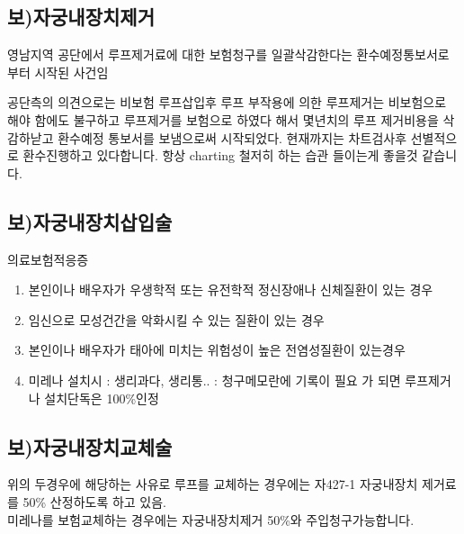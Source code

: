 \subsection{보)자궁내장치제거}
{
\par
영남지역 공단에서 루프제거료에 대한 보험청구를 일괄삭감한다는 환수예정통보서로 부터 시작된 사건임\par
공단측의 의견으로는 비보험 루프삽입후 루프 부작용에 의한 루프제거는 비보험으로 해야 함에도 불구하고 루프제거를 보험으로 하였다 해서 몇년치의 루프 제거비용을 삭감하낟고 환수예정 통보서를 보냄으로써 시작되었다. 현재까지는 차트검사후 선별적으로 환수진행하고 있다합니다. 항상 charting 철저히 하는 습관 들이는게 좋을것 같습니다.
}

\subsection{보)자궁내장치삽입술}
의료보험적응증 
\begin{enumerate}[1)]\tightlist
\item 본인이나 배우자가 우생학적 또는 유전학적 정신장애나 신체질환이 있는 경우
\item 임신으로 모성건간을 악화시킬 수 있는 질환이 있는 경우
\item 본인이나 배우자가 태아에 미치는 위험성이 높은 전염성질환이 있는경우
\item 미레나 설치시 : 생리과다, 생리통.. : 청구메모란에 기록이 필요 가 되면 루프제거나 설치단독은 100\%인정
\end{enumerate}

\subsection{보)자궁내장치교체술}
위의 두경우에 해당하는 사유로 루프를 교체하는 경우에는 자427-1 자궁내장치 제거료를 50\% 산정하도록 하고 있음.\\
미레나를 보험교체하는 경우에는 자궁내장치제거 50\%와 주입청구가능합니다.

